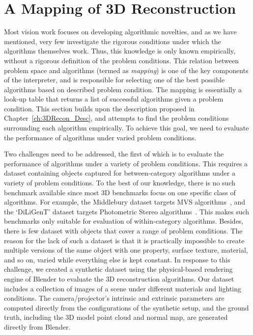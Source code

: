 
\chapter{A Mapping of 3D Reconstruction}
\label{ch:3DRecon_Mapping}
Most vision work focuses on developing algorithmic novelties, and as we have mentioned, very few investigate the rigorous conditions under which the algorithms themselves work. Thus, this knowledge is only known empirically, without a rigorous definition of the problem conditions. This relation between problem space and algorithms (termed as \textit{mapping}) is one of the key components of the interpreter, and is responsible for selecting one of the best possible algorithms based on described problem condition. The mapping is essentially a look-up table that returns a list of successful algorithms given a problem condition. This section builds upon the description proposed in Chapter~\ref{ch:3DRecon_Desc}, and attempts to find the problem conditions surrounding each algorithm empirically. To achieve this goal, we need to evaluate the performance of algorithms under varied problem conditions.

Two challenges need to be addressed, the first of which is to evaluate the performance of algorithms under a variety of problem conditions. This requires a dataset containing objects captured for between-category algorithms under a variety of problem conditions. To the best of our knowledge, there is no such benchmark available since most 3D benchmarks focus on one specific class of algorithms. For example, the Middlebury dataset targets MVS algorithms~\cite{seitz2006comparison}, and the `DiLiGenT' dataset targets Photometric Stereo algorithms~\cite{shi2016benchmark}. This makes such benchmarks only suitable for evaluation of within-category algorithms. Besides, there is few dataset with objects that cover a range of problem conditions. The reason for the lack of such a dataset is that it is practically impossible to create multiple versions of the same object with one property, \eg surface texture, material, and so on, varied while everything else is kept constant. In response to this challenge, we created a synthetic dataset using the physical-based rendering engine of Blender to evaluate the 3D reconstruction algorithms. Our dataset includes a collection of images of a scene under different materials and lighting conditions. The camera/projector's intrinsic and extrinsic parameters are computed directly from the configurations of the synthetic setup, and the ground truth, including the 3D model point cloud and normal map, are generated directly from Blender.

